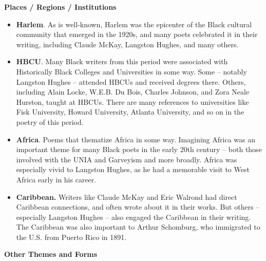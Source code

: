 \documentclass[
  letterpaper,
  DIV=11,
  numbers=noendperiod]{scrartcl}
\providecommand{\tightlist}{%
  \setlength{\itemsep}{0pt}\setlength{\parskip}{0pt}}\usepackage{longtable,booktabs,array}
\begin{document}
\textbf{Places / Regions / Institutions}

\begin{itemize}
\tightlist
\item
  \textbf{Harlem}. As is well-known, Harlem was the epicenter of the
  Black cultural community that emerged in the 1920s, and many poets
  celebrated it in their writing, including Claude McKay, Langston
  Hughes, and many others.
\item
  \textbf{HBCU}. Many Black writers from this period were associated
  with Historically Black Colleges and Universities in some way. Some --
  notably Langston Hughes -- attended HBCUs and received degrees there.
  Others, including Alain Locke, W.E.B. Du Bois, Charles Johnson, and
  Zora Neale Hurston, taught at HBCUs. There are many references to
  universities like Fisk University, Howard University, Atlanta
  University, and so on in the poetry of this period.
\item
  \textbf{Africa}. Poems that thematize Africa in some way. Imagining
  Africa was an important theme for many Black poets in the early 20th
  century -- both those involved with the UNIA and Garveyism and more
  broadly. Africa was especially vivid to Langston Hughes, as he had a
  memorable visit to West Africa early in his career.\\
\item
  \textbf{Caribbean. }Writers like Claude McKay and Eric Walrond had
  direct Caribbean connections, and often wrote about it in their works.
  But others -- especially Langston Hughes -- also engaged the Caribbean
  in their writing. The Caribbean was also important to Arthur
  Schomburg, who immigrated to the U.S. from Puerto Rico in 1891.
\end{itemize}

\textbf{Other Themes and Forms}
\end{document}
